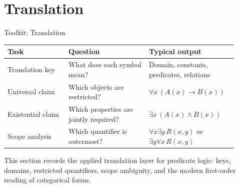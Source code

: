 \section{Translation}

\begin{toolkitbox}{Toolkit: Translation}
\small
\begin{tabular}{p{0.25\linewidth} p{0.33\linewidth} p{0.33\linewidth}}
\toprule
\textbf{Task} & \textbf{Question} & \textbf{Typical output} \\
\midrule
Translation key & What does each symbol mean? & Domain, constants, predicates, relations \\
Universal claim & Which objects are restricted? & \(\forall x\,(A(x)\to B(x))\) \\
Existential claim & Which properties are jointly required? & \(\exists x\,(A(x)\land B(x))\) \\
Scope analysis & Which quantifier is outermost? & \(\forall x\exists y\,R(x,y)\) or \(\exists y\forall x\,R(x,y)\) \\
\bottomrule
\end{tabular}
\end{toolkitbox}

\begin{remark*}[Exposition]
This section records the applied translation layer for predicate logic: keys,
domains, restricted quantifiers, scope ambiguity, and the modern first-order
reading of categorical forms.
\end{remark*}



